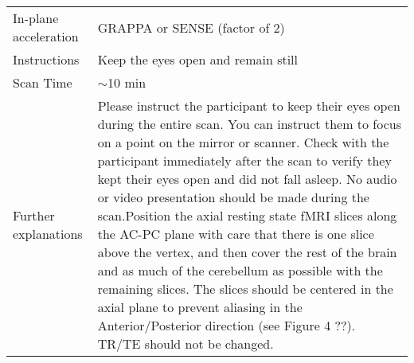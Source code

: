 \documentclass[
	a4paper, 
	11.5pt,
	headings=small, 
	twoside, 
	titlepage=firstiscover, 
 	pagesize=auto,
  	version=last,
	open=any,
	BCOR=14mm,
  	chapterprefix=false]{scrbook}
\begin{document}
\begin{table}[H]
\begin{tabularx}{1\textwidth}{@{}X *{1}{X}@{}}
In-plane acceleration                             				& GRAPPA or SENSE (factor of 2) \\
Instructions                                      					& Keep the eyes open and remain still \\
Scan Time                                         					& $\sim$10 min \\
Further explanations                              				& Please instruct the participant to keep their eyes open during the entire scan. You can instruct them to focus on a point on the mirror or scanner. Check with the participant immediately after the scan to verify they kept their eyes open and did not fall asleep. No audio or video presentation should be made during the scan.Position the axial resting state fMRI slices along the AC-PC plane with care that there is one slice above the vertex, and then cover the rest of the brain and as much of the cerebellum as possible with the remaining slices. The slices should be centered in the axial plane to prevent aliasing in the Anterior/Posterior direction (see Figure 4 ??). \ac{TR}/\ac{TE} should not be changed. \\
\bottomrule
\end{tabularx}
\end{table}
\end{document}

